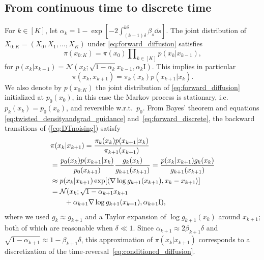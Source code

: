 \documentclass{article}
\theoremstyle{plain}
\theoremstyle{definition}
\theoremstyle{remark}
\begin{document}
\subsection{From continuous time to discrete time}
For $k \in [K]$, let $\alpha_k = 1 - \exp[-2\int_{(k-1)\delta}^{k\delta} \beta_s \dd s]$.
The joint distribution of $X_{0:K}=(X_0,X_1,..., X_K)$ under \eqref{eq:forward_diffusion} satisfies
\begin{equation}\label{eq:DTnoising}
	\textstyle
	\pi(x_{0:K})=\pi(x_0) \prod\nolimits_{k\in[K]} p(x_k|x_{k-1}) ,
\end{equation}
for $p(x_k|x_{k-1})=\mathcal{N}(x_k;\sqrt{1-\alpha_k}x_{k-1},\alpha_k \mathrm{I})$. This implies in particular
\begin{equation}
	\label{eq:forward_discrete}
	\pi(x_k, x_{k+1}) = \pi_k(x_k) p(x_{k+1}|x_k).
\end{equation}
We also denote by $p(x_{0:K})$ the joint distribution of \eqref{eq:forward_diffusion} initialized at $p_0(x_0)$, in this case the Markov process is stationary, i.e. $p_k(x_k)=p_0(x_k)$, and reversible w.r.t.\ $p_0$.
From Bayes' theorem and equations \eqref{eq:twisted_densityandgrad_guidance} and~\eqref{eq:forward_discrete}, the backward transitions of (\ref{eq:DTnoising}) satisfy
\begin{align}
	 & \pi(x_k|x_{k+1})=\frac{\pi_k(x_k) p(x_{k+1}|x_k)}{\pi_{k+1}(x_{k+1})} \nonumber                                         \\
	 & = \frac{p_0(x_k) p(x_{k+1}|x_k)}{p_0(x_{k+1})} \frac{g_k(x_k)}{g_{k+1}(x_{k+1})}
	= \frac{p(x_{k}|x_{k+1}) g_k(x_k)}{g_{k+1}(x_{k+1})} \nonumber                                                             \\
	 & \approx p(x_k|x_{k+1}) \exp[\langle \nabla\log g_{k+1}(x_{k+1}), x_k - x_{k+1}\rangle ] \nonumber                         \\
	 & = \textstyle \mathcal N(x_k; \sqrt{1-\alpha_{k+1}} x_{k+1} \nonumber                                                    \\
	 & \qquad + \alpha_{k+1} \nabla\log g_{k+1}(x_{k+1}), \alpha_{k+1} \mathrm{I}) ,  \label{eq:approximate_proposal_derivation}
\end{align}
where we used $g_k \approx g_{k+1}$ and a Taylor expansion of $\log g_{k+1}(x_k)$ around $x_{k+1}$; both of which are reasonable when $\delta \ll 1$. Since $\alpha_{k+1} \approx 2 \beta_{k+1} \delta$ and $\sqrt{1-\alpha_{k+1}}\approx 1 -\beta_{k+1}\delta $, this approximation of $\pi(x_k|x_{k+1})$ corresponds to a discretization of the time-reversal~\eqref{eq:conditioned_diffusion}.
\end{document}
